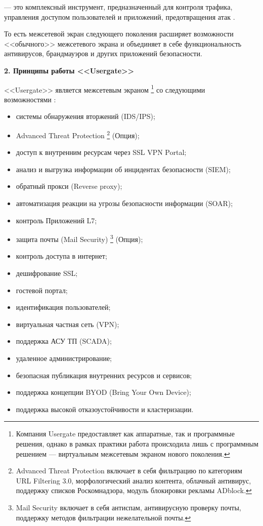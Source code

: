  --- это комплексный инструмент, предназначенный для контроля трафика, управления доступом пользователей и приложений, предотвращения атак \cite{ngfw2}.

То есть межсетевой экран следующего поколения расширяет возможности <<обычного>> межсетевого экрана и объединяет в себе функциональность антивирусов, брандмауэров и других приложений безопасности.

\begin{center}
	\textbf{\Large 2. Принципы работы <<Usergate>>}
\end{center}

<<Usergate>> является межсетевым экраном \footnote{Компания Usergate предоставляет как аппаратные, так и программные решения, однако в рамках практики работа происходила лишь с программным решением --- виртуальным межсетевым экраном нового поколения.} со следующими \\ возможностями \cite{usergate_capabilities}:
		
\begin{itemize}
	\item системы обнаружения вторжений (IDS/IPS);
	\item Advanced Threat Protection \footnote{Advanced Threat Protection включает в себя фильтрацию по категориям URL Filtering 3.0, морфологический анализ контента, облачный антивирус, поддержку списков Роскомнадзора, модуль блокировки рекламы ADblock.} (Опция);
	\item доступ к внутренним ресурсам через SSL VPN Portal;
	\item анализ и выгрузка информации об инцидентах безопасности (SIEM);
	\item обратный прокси (Reverse proxy);
	\item автоматизация реакции на угрозы безопасности информации (SOAR);
	\item контроль Приложений L7;
	\item защита почты (Mail Security) \footnote{Mail Security включает в себя антиспам, антивирусную проверку почты, поддержку методов фильтрации нежелательной почты.} (Опция);
	\item контроль доступа в интернет;
	\item дешифрование SSL;
	\item гостевой портал;
	\item идентификация пользователей;
	\item виртуальная частная сеть (VPN);
	\item поддержка АСУ ТП (SCADA);
	\item удаленное администрирование;
	\item безопасная публикация внутренних ресурсов и сервисов;
	\item поддержка концепции BYOD (Bring Your Own Device);
	\item поддержка высокой отказоустойчивости и кластеризации.
\end{itemize}
	
